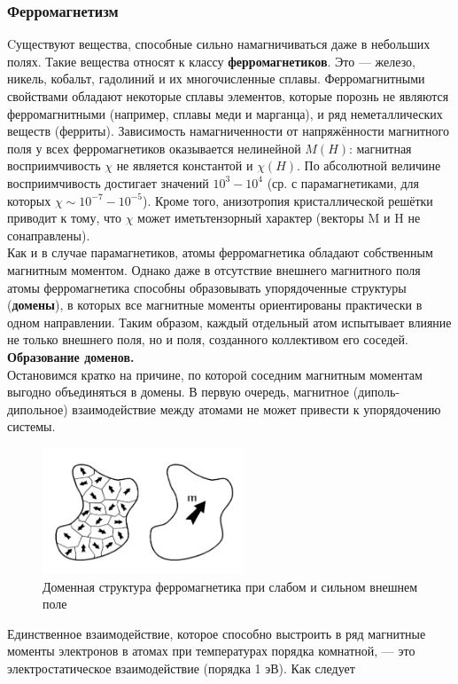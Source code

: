 \documentclass[a4paper]{article}
\begin{document}
	\subsubsection{Ферромагнетизм}
	 Cуществуют вещества, способные сильно намагничиваться даже в небольших полях. Такие вещества относят к классу \textbf{ферромагнетиков}. Это — железо, никель, кобальт, гадолиний и их многочисленные сплавы. Ферромагнитными свойствами обладают некоторые сплавы элементов, которые порознь не являются ферромагнитными (например, сплавы меди и марганца), и ряд неметаллических веществ (ферриты). 
Зависимость намагниченности от напряжённости магнитного поля у всех ферромагнетиков оказывается нелинейной $M(H)$: магнитная восприимчивость $\chi$ не является константой и $\chi(H)$. По абсолютной величине восприимчивость достигает значений $10^3 - 10^4$
(ср. с парамагнетиками, для которых  $\chi \sim 10^{-7} - 10^{-5}$). Кроме того, анизотропия кристаллической решётки приводит к тому, что $\chi$ может иметьтензорный характер (векторы M и H не сонаправлены).\\
Как и в случае парамагнетиков, атомы ферромагнетика обладают собственным магнитным моментом. Однако даже в отсутствие внешнего магнитного поля атомы ферромагнетика способны образовывать упорядоченные структуры (\textbf{домены}), в которых все магнитные моменты ориентированы практически в одном направлении. Таким образом, каждый отдельный атом испытывает влияние не только внешнего поля, но и поля, созданного коллективом его соседей.\\
	\textbf{Образование доменов.}\\
	Остановимся кратко на причине, по которой соседним магнитным моментам выгодно объединяться в домены.
В первую очередь, магнитное (диполь-дипольное) взаимодействие между атомами не может привести к упорядочению системы. \\
        \begin{figure}[H]
		\centering
		\includegraphics[width=6cm]{theory1.png}
		\caption{Доменная структура ферромагнетика при слабом и сильном внешнем поле}
	\end{figure} 
Единственное взаимодействие, которое способно выстроить в ряд магнитные моменты электронов в атомах при температурах порядка комнатной, --- это электростатическое взаимодействие (порядка 1 эВ). Как следует
\end{document}
